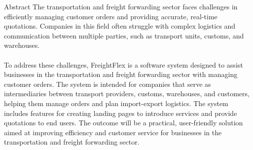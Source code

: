 \begin{preface}{Abstract}
The transportation and freight forwarding sector faces challenges in efficiently managing customer orders and providing accurate, real-time quotations. Companies in this field often struggle with complex logistics and communication between multiple parties, such as transport units, customs, and warehouses.
\\
\\
To address these challenges, FreightFlex is a software system designed to assist businesses in the transportation and freight forwarding sector with managing customer orders. The system is intended for companies that serve as intermediaries between transport providers, customs, warehouses, and customers, helping them manage orders and plan import-export logistics.
The system includes features for creating landing pages to introduce services and provide quotations to end users.
The outcome will be a practical, user-friendly solution aimed at improving efficiency and customer service for businesses in the transportation and freight forwarding sector.
\end{preface}
